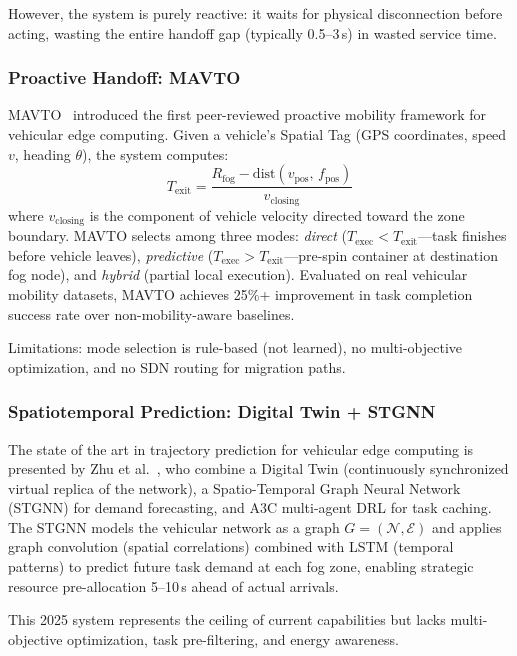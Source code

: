 \documentclass[12pt,a4paper]{article}
\begin{document}
However, the system is purely reactive: it waits for physical disconnection before
acting, wasting the entire handoff gap (typically 0.5--3\,s) in wasted service time.

\subsubsection{Proactive Handoff: MAVTO}

MAVTO~\cite{mavto2024} introduced the first peer-reviewed proactive mobility
framework for vehicular edge computing. Given a vehicle's Spatial Tag (GPS
coordinates, speed $v$, heading $\theta$), the system computes:
\begin{equation}
  T_{\text{exit}} = \frac{R_{\text{fog}} - \text{dist}(v_{\text{pos}},\, f_{\text{pos}})}
  {v_{\text{closing}}}
  \label{eq:texit}
\end{equation}
where $v_{\text{closing}}$ is the component of vehicle velocity directed toward
the zone boundary. MAVTO selects among three modes: \emph{direct}
($T_{\text{exec}} < T_{\text{exit}}$---task finishes before vehicle leaves),
\emph{predictive} ($T_{\text{exec}} > T_{\text{exit}}$---pre-spin container at
destination fog node), and \emph{hybrid} (partial local execution). Evaluated on
real vehicular mobility datasets, MAVTO achieves 25\%+ improvement in task
completion success rate over non-mobility-aware baselines.

Limitations: mode selection is rule-based (not learned), no multi-objective
optimization, and no SDN routing for migration paths.

\subsubsection{Spatiotemporal Prediction: Digital Twin + STGNN}

The state of the art in trajectory prediction for vehicular edge computing is
presented by Zhu et al.~\cite{zhu2025spatiotemporal}, who combine a Digital Twin
(continuously synchronized virtual replica of the network), a
Spatio-Temporal Graph Neural Network (STGNN) for demand forecasting, and A3C
multi-agent DRL for task caching. The STGNN models the vehicular network as a
graph $G = (\mathcal{N}, \mathcal{E})$ and applies graph convolution (spatial
correlations) combined with LSTM (temporal patterns) to predict future task
demand at each fog zone, enabling strategic resource pre-allocation 5--10\,s ahead
of actual arrivals.

This 2025 system represents the ceiling of current capabilities but lacks
multi-objective optimization, task pre-filtering, and energy awareness.
\end{document}
